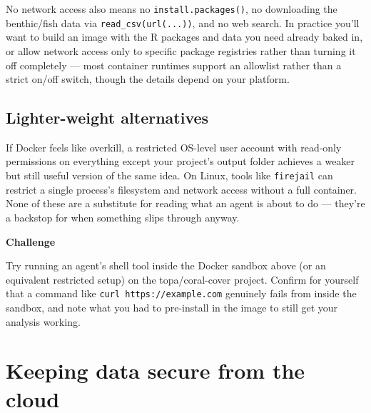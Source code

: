 \documentclass[
  letterpaper,
  DIV=11,
  numbers=noendperiod]{scrreprt}
\begin{document}
No network access also means no \texttt{install.packages()}, no
downloading the benthic/fish data via \texttt{read\_csv(url(...))}, and
no web search. In practice you'll want to build an image with the R
packages and data you need already baked in, or allow network access
only to specific package registries rather than turning it off
completely --- most container runtimes support an allowlist rather than
a strict on/off switch, though the details depend on your platform.

\section{Lighter-weight alternatives}\label{lighter-weight-alternatives}

If Docker feels like overkill, a restricted OS-level user account with
read-only permissions on everything except your project's output folder
achieves a weaker but still useful version of the same idea. On Linux,
tools like \texttt{firejail} can restrict a single process's filesystem
and network access without a full container. None of these are a
substitute for reading what an agent is about to do --- they're a
backstop for when something slips through anyway.

\begin{tcolorbox}[enhanced jigsaw, toprule=.15mm, rightrule=.15mm, left=2mm, leftrule=.75mm, breakable, opacityback=0, arc=.35mm, colframe=quarto-callout-important-color-frame, bottomrule=.15mm, colback=white]
\begin{minipage}[t]{5.5mm}
\textcolor{quarto-callout-important-color}{\faExclamation}
\end{minipage}%
\begin{minipage}[t]{\textwidth - 5.5mm}

\vspace{-3mm}\textbf{Challenge}\vspace{3mm}

Try running an agent's shell tool inside the Docker sandbox above (or an
equivalent restricted setup) on the topa/coral-cover project. Confirm
for yourself that a command like \texttt{curl\ https://example.com}
genuinely fails from inside the sandbox, and note what you had to
pre-install in the image to still get your analysis working.

\end{minipage}%
\end{tcolorbox}

\chapter{Keeping data secure from the
cloud}\label{keeping-data-secure-from-the-cloud}
\end{document}
